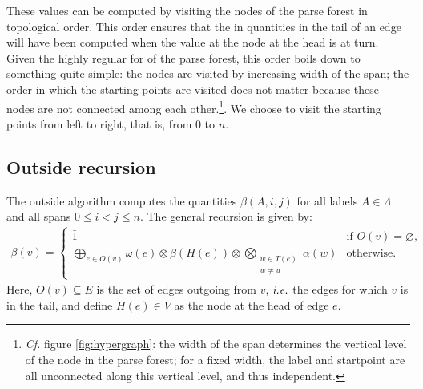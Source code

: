     These values can be computed by visiting the nodes of the parse forest in topological order. This order ensures that the in quantities in the tail of an edge will have been computed when the value at the node at the head is at turn. Given the highly regular for of the parse forest, this order boils down to something quite simple: the nodes are visited by increasing width of the span; the order in which the starting-points are visited does not matter because these nodes are not connected among each other.\footnote{\textit{Cf.} figure \ref{fig:hypergraph}: the width of the span determines the vertical level of the node in the parse forest; for a fixed width, the label and startpoint are all unconnected along this vertical level, and thus independent.}. We choose to visit the starting points from left to right, that is, from 0 to $n$.

  \subsection{Outside recursion}
    The outside algorithm computes the quantities $\beta(A,i,j)$ for all labels $A \in \Lambda$ and all spans $0 \leq i < j \leq n$. The general recursion is given by:
    \begin{align*}
      \beta(v) =
        \begin{cases}
          \bar{1}  & \mbox{if } O(v) = \varnothing, \\
          \displaystyle\bigoplus_{e \in O(v)} \omega(e) \otimes \beta(H(e)) \otimes \displaystyle\bigotimes_{ \substack{ w \in T(e) \\ w \neq u } } \alpha(w)  & \mbox{otherwise.}
        \end{cases}
    \end{align*}
    Here, $O(v) \subseteq E$ is the set of edges outgoing from $v$, $\emph{i.e.}$ the edges for which $v$ is in the tail, and define $H(e) \in V$ as the node at the head of edge $e$.

